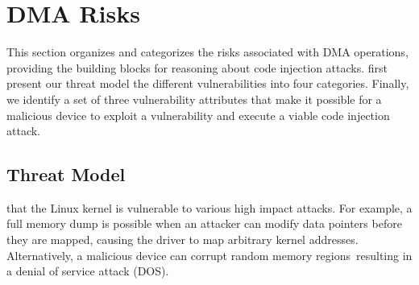 
\section{\DIFdelbegin {}\DIFdelend \DIFaddbegin {}\DIFaddend DMA Risks}\label{sec:dma-risks}
This section organizes and categorizes the risks associated with DMA operations, providing the building blocks for reasoning about code injection attacks.
\DIFdelbegin {}\DIFdelend \DIFaddbegin {}\DIFaddend first present our threat model \DIFdelbegin {}\DIFdelend \DIFaddbegin {}\DIFaddend the different \subpage{} vulnerabilities into four categories.
Finally, we identify a set of three vulnerability attributes that make it possible for a malicious device to exploit a \subpage{} vulnerability and execute a viable code injection attack.

\subsection{Threat Model}\label{sec:threat_model}
\DIFdelbegin {}\DIFdelend \DIFaddbegin {}\DIFaddend that the Linux kernel is vulnerable to various high impact attacks.
For example, a full memory dump is possible when an attacker can modify data pointers before they are mapped, causing the driver to map arbitrary kernel addresses.
Alternatively, a malicious device can corrupt random memory regions~\cite{MMT16}\DIFaddbegin \DIFadd{, }\DIFaddend resulting in a denial of service attack (DOS).



